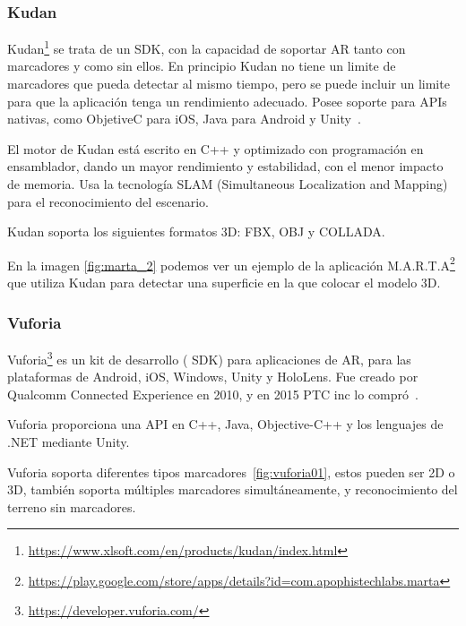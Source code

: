 

\subsubsection{Kudan} 

Kudan\footnote{\url{https://www.xlsoft.com/en/products/kudan/index.html}} 
se trata de un SDK, con la capacidad de soportar AR tanto con marcadores y como sin ellos. En principio Kudan no tiene un limite de marcadores que pueda detectar al mismo tiempo, pero se puede incluir un limite para que la aplicación tenga un rendimiento adecuado. 
Posee soporte para APIs nativas, como ObjetiveC para iOS, Java para Android y Unity~\cite{kudan_developer_hub}.

El motor de Kudan está escrito en C++ y optimizado con programación en ensamblador, dando un mayor rendimiento y estabilidad, con el menor impacto de memoria.
Usa la tecnología SLAM (Simultaneous Localization and Mapping) para el reconocimiento del escenario.

Kudan soporta los siguientes formatos 3D: FBX, OBJ y COLLADA.

En la imagen \ref{fig:marta_2} podemos ver un ejemplo de la aplicación M.A.R.T.A\footnote{\url{https://play.google.com/store/apps/details?id=com.apophistechlabs.marta}} que utiliza Kudan para detectar una superficie en la que colocar el modelo 3D.




\subsubsection{Vuforia}\label{sub:Def_Vuforia}

Vuforia\footnote{\url{https://developer.vuforia.com/}} es un kit de desarrollo ( SDK) para aplicaciones de AR, para las plataformas de Android, iOS, Windows, Unity y HoloLens. Fue creado por Qualcomm Connected Experience en 2010, y en 2015 PTC inc lo compró~\cite{simonetti2013vuforia}.

Vuforia proporciona una API en C++, Java, Objective-C++ y los lenguajes de .NET mediante Unity.

Vuforia soporta diferentes tipos marcadores~\ref{fig:vuforia01}, estos pueden ser 2D o 3D, también soporta múltiples marcadores simultáneamente, y reconocimiento del terreno sin marcadores.


